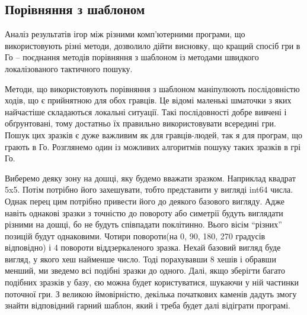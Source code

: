 \subsection{Порівняння з шаблоном}
Аналіз результатів ігор між різними комп'ютерними програми, що використовують різні методи, дозволило дійти висновку, що кращий спосіб гри в Го -- поєднання методів порівняння з шаблоном із методами швидкого локалізованого тактичного пошуку.

Методи, що використовують порівняння з шаблоном маніпулюють послідовністю ходів, що є прийнятною для обох гравців. Це відомі маленькі шматочки з яких найчастіше складаються локальні ситуації. Такі послідовності добре вивчені і обґрунтовані, тому достатньо їх правильно використовувати всередині гри. Пошук цих зразків є дуже важливим як для гравців-людей, так я для програм, що грають в Го. Розглянемо один із можливих алгоритмів пошуку таких зразків в грі Го.

Виберемо деяку зону на дошці, яку будемо вважати зразком. Наприклад квадрат 5x5. Потім потрібно його захешувати, тобто представити у вигляді int64 числа. Однак перец цим потрібно привести його до деякого базового вигляду. Адже навіть однакові зразки з точністю до повороту або симетрії будуть виглядати різними на дошці, бо не будуть співпадати поклітинно. Вього вісім ``різних'' позицій будут однаковими. Чотири повороти(на 0, 90, 180, 270 градусів відповідно) і 4 повороти віддзеркаленого зразка. Нехай базовий вигляд буде вигляд, у якого хеш найменше число. Тоді порахувавши 8 хешів і обравши менший, ми зведемо всі подібні зразки до одного. Далі, якщо зберігти багато подібних зразків у базу, єю можна будет користуватися, шукаючи у ній частинки поточної гри. З великою ймовірністю, декілька початкових каменів дадуть змогу знайти відповідний гарний шаблон, який і треба будет далі відіграти програмі.
